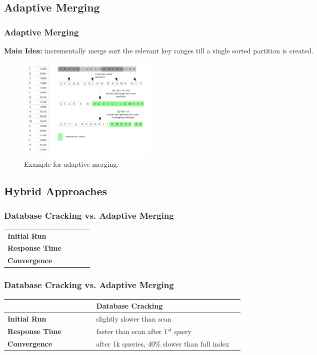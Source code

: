 \documentclass{beamer}
\begin{document}
\subsection{Adaptive Merging}
\begin{frame}
\frametitle{Adaptive Merging}
\textbf{Main Idea: }incrementally merge sort the relevant key ranges till a single sorted partition is created. \pause
\begin{figure}
\centering
\includegraphics[width=\linewidth, height=5cm, keepaspectratio]{graphics/merging.png}
\caption{Example for adaptive merging.}
\end{figure}
\end{frame}

\subsection{Hybrid Approaches}
\begin{frame}
\frametitle{Database Cracking vs. Adaptive Merging}
\begin{tabular}{| M{0.2\linewidth} | }
\hline 
  \\ 
\hline 
\textbf{Initial Run} \\ 
\hline 
\textbf{Response Time} \\ 
\hline 
\textbf{Convergence} \\ 
\hline 
\end{tabular} 
\end{frame}

\begin{frame}
\frametitle{Database Cracking vs. Adaptive Merging}
\begin{tabular}{| M{0.2\linewidth} | M{0.35\linewidth} |}
\hline 
 & \textbf{Database Cracking} \\ 
\hline 
\textbf{Initial Run} & \color{green} slightly slower than scan \\ 
\hline 
\textbf{Response Time} & \color{green} faster than scan after 1$^{st}$ query \\ 
\hline 
\textbf{Convergence} & \color{red} after 1k queries, 40\% slower than full index  \\ 
\hline 
\end{tabular} 
\end{frame}
\end{document}
